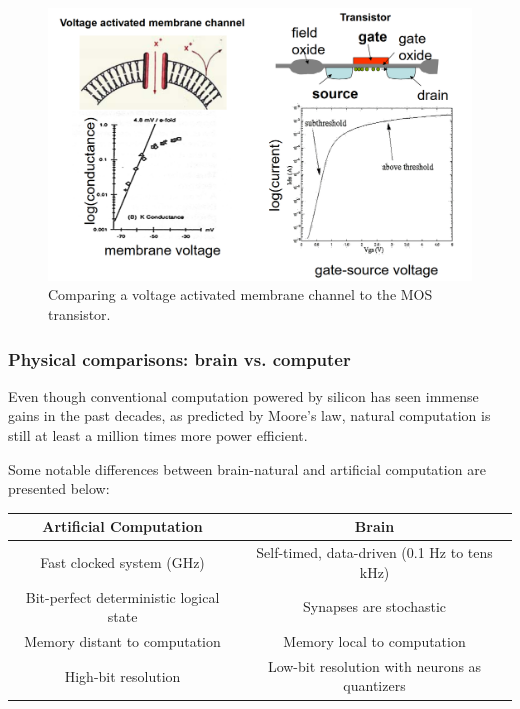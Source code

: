 \documentclass[main]{subfiles}
\begin{document}
%
\begin{figure}[h]
    \centering
    \includegraphics[width=0.8\linewidth]{11_NeuromorphicSystems1/figures/mem_vs_transist.PNG}
    \caption{Comparing a voltage activated membrane channel to the MOS transistor.}
    \label{fig:MEMvsTRANS}
\end{figure}
%

\subsubsection{Physical comparisons: brain vs. computer}
Even though conventional computation powered by silicon has seen immense gains in the past decades, as predicted by Moore's law, natural computation is still at least a million times more power efficient.

Some notable differences between brain-natural and artificial computation are presented below:

\begin{table}[h]
\begin{tabular}{|c|c|}
\hline
\textbf{Artificial Computation}         & \textbf{Brain}                                \\ \hline
Fast clocked system (GHz)               & Self-timed, data-driven (0.1 Hz to tens kHz)  \\ \hline
Bit-perfect deterministic logical state & Synapses are stochastic                       \\ \hline
Memory distant to computation           & Memory local to computation                   \\ \hline
High-bit resolution                     & Low-bit resolution with neurons as quantizers \\ \hline
\end{tabular}
\end{table}
\end{document}
